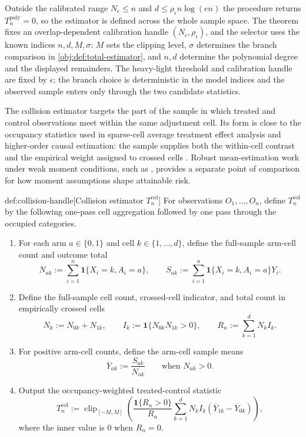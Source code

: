 Outside the calibrated range \(N_{\epsilon}\le n\) and \(d\le\rho_{\epsilon}n\log(en)\) the procedure returns \(T_n^{\mathrm{poly}}=0\), so the estimator is defined across the whole sample space. The theorem fixes an overlap-dependent calibration handle \((N_\epsilon,\rho_\epsilon)\), and the selector uses the known indices \(n,d,M,\sigma\): \(M\) sets the clipping level, \(\sigma\) determines the branch comparison in \cref{obj:def:total-estimator}, and \(n,d\) determine the polynomial degree and the displayed remainders. The heavy-light threshold and calibration handle are fixed by \(\epsilon\); the branch choice is deterministic in the model indices and the observed sample enters only through the two candidate statistics.

The collision estimator targets the part of the sample in which treated and control observations meet within the same adjustment cell. Its form is close to the occupancy statistics used in sparse-cell average treatment effect analysis and higher-order causal estimation: the sample supplies both the within-cell contrast and the empirical weight assigned to crossed cells \citep{Robins2008,Robins2017}. Robust mean-estimation work under weak moment conditions, such as \citet{LugosiMendelson2019}, provides a separate point of comparison for how moment assumptions shape attainable risk.

\begin{algorithmv}{def:collision-handle}[Collision estimator \(T_n^{\mathrm{col}}\)]
For observations \(O_1,\ldots,O_n\), define \(T_n^{\mathrm{col}}\) by the following one-pass cell aggregation followed by one pass through the occupied categories.

\begin{enumerate}
\item For each arm \(a\in\{0,1\}\) and cell \(k\in\{1,\ldots,d\}\), define the full-sample arm-cell count and outcome total
\[
N_{ak}
:=
\sum_{i=1}^n\mathbf 1\{X_i=k,A_i=a\},
\qquad
S_{ak}
:=
\sum_{i=1}^n\mathbf 1\{X_i=k,A_i=a\}Y_i.
\]

\item Define the full-sample cell count, crossed-cell indicator, and total count in empirically crossed cells
\[
N_k:=N_{0k}+N_{1k},
\qquad
I_k:=\mathbf 1\{N_{0k}N_{1k}>0\},
\qquad
R_n:=\sum_{k=1}^d N_k I_k.
\]

\item For positive arm-cell counts, define the arm-cell sample means
\[
\overline Y_{ak}:=\frac{S_{ak}}{N_{ak}}
\qquad\text{when }N_{ak}>0.
\]

\item Output the occupancy-weighted treated-control statistic
\[
T_n^{\mathrm{col}}
:=
\operatorname{clip}_{[-M,M]}
\left(
\frac{\mathbf 1\{R_n>0\}}{R_n}
\sum_{k=1}^d
N_kI_k(\overline Y_{1k}-\overline Y_{0k})
\right),
\]
where the inner value is \(0\) when \(R_n=0\).
\end{enumerate}
\end{algorithmv}


